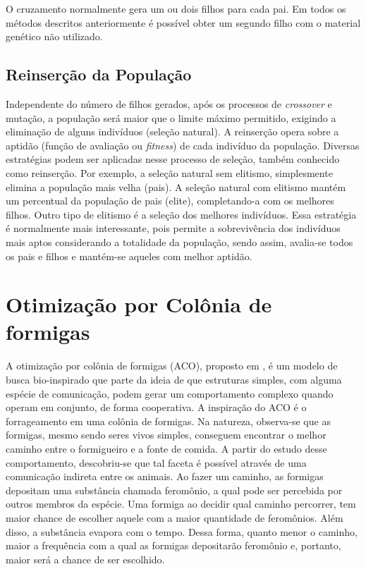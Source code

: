 O cruzamento normalmente gera um ou dois filhos para cada pai. Em todos os métodos descritos anteriormente é possível obter um segundo filho com o material genético não utilizado.

\subsection{Reinserção da População}
Independente do número de filhos gerados, após os processos de \textit{crossover} e mutação, a população será maior que o limite máximo permitido, exigindo a eliminação de alguns indivíduos (seleção natural). A reinserção opera sobre a aptidão (função de avaliação ou \textit{fitness}) de cada indivíduo da população. Diversas estratégias podem ser aplicadas nesse processo de seleção, também conhecido como reinserção. Por exemplo, a seleção natural sem elitismo, simplesmente elimina a população mais velha (pais). A seleção natural com elitismo mantém um percentual da população de pais (elite), completando-a com os melhores filhos. Outro tipo de elitismo é a seleção dos melhores indivíduos. Essa estratégia é normalmente mais interessante, pois permite a sobrevivência dos indivíduos mais aptos considerando a totalidade da população, sendo assim, avalia-se todos os pais e filhos e mantém-se aqueles com melhor aptidão.

\section{Otimização por Colônia de formigas}
\label{section_aco}
A otimização por colônia de formigas (ACO), proposto em \cite{Dorigo1996}, é um modelo de busca bio-inspirado que parte da ideia de que estruturas simples, com alguma espécie de comunicação, podem gerar um comportamento complexo quando operam em conjunto, de forma cooperativa. A inspiração do ACO é o forrageamento em uma colônia de formigas. Na natureza, observa-se que as formigas, mesmo sendo seres vivos simples, conseguem encontrar o melhor caminho entre o formigueiro e a fonte de comida. A partir do estudo desse comportamento, descobriu-se que tal faceta é possível através de uma comunicação indireta entre os animais. Ao fazer um caminho, as formigas depositam uma substância chamada feromônio, a qual pode ser percebida por outros membros da espécie. Uma formiga ao decidir qual caminho percorrer, tem maior chance de escolher aquele com a maior quantidade de feromônios. Além disso, a substância evapora com o tempo. Dessa forma, quanto menor o caminho, maior a frequência com a qual as formigas depositarão feromônio e, portanto, maior será a chance de ser escolhido.


